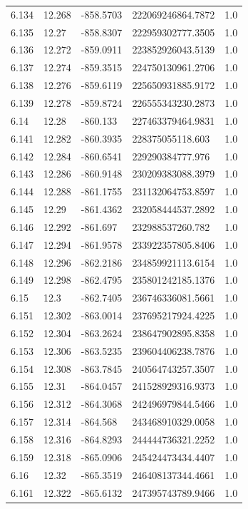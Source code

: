 \begin{tabular}{lllll}
6.134 & 12.268 & -858.5703 & 222069246864.7872 & 1.0 \\
6.135 & 12.27 & -858.8307 & 222959302777.3505 & 1.0 \\
6.136 & 12.272 & -859.0911 & 223852926043.5139 & 1.0 \\
6.137 & 12.274 & -859.3515 & 224750130961.2706 & 1.0 \\
6.138 & 12.276 & -859.6119 & 225650931885.9172 & 1.0 \\
6.139 & 12.278 & -859.8724 & 226555343230.2873 & 1.0 \\
6.14 & 12.28 & -860.133 & 227463379464.9831 & 1.0 \\
6.141 & 12.282 & -860.3935 & 228375055118.603 & 1.0 \\
6.142 & 12.284 & -860.6541 & 229290384777.976 & 1.0 \\
6.143 & 12.286 & -860.9148 & 230209383088.3979 & 1.0 \\
6.144 & 12.288 & -861.1755 & 231132064753.8597 & 1.0 \\
6.145 & 12.29 & -861.4362 & 232058444537.2892 & 1.0 \\
6.146 & 12.292 & -861.697 & 232988537260.782 & 1.0 \\
6.147 & 12.294 & -861.9578 & 233922357805.8406 & 1.0 \\
6.148 & 12.296 & -862.2186 & 234859921113.6154 & 1.0 \\
6.149 & 12.298 & -862.4795 & 235801242185.1376 & 1.0 \\
6.15 & 12.3 & -862.7405 & 236746336081.5661 & 1.0 \\
6.151 & 12.302 & -863.0014 & 237695217924.4225 & 1.0 \\
6.152 & 12.304 & -863.2624 & 238647902895.8358 & 1.0 \\
6.153 & 12.306 & -863.5235 & 239604406238.7876 & 1.0 \\
6.154 & 12.308 & -863.7845 & 240564743257.3507 & 1.0 \\
6.155 & 12.31 & -864.0457 & 241528929316.9373 & 1.0 \\
6.156 & 12.312 & -864.3068 & 242496979844.5466 & 1.0 \\
6.157 & 12.314 & -864.568 & 243468910329.0058 & 1.0 \\
6.158 & 12.316 & -864.8293 & 244444736321.2252 & 1.0 \\
6.159 & 12.318 & -865.0906 & 245424473434.4407 & 1.0 \\
6.16 & 12.32 & -865.3519 & 246408137344.4661 & 1.0 \\
6.161 & 12.322 & -865.6132 & 247395743789.9466 & 1.0 \\

\end{tabular}

